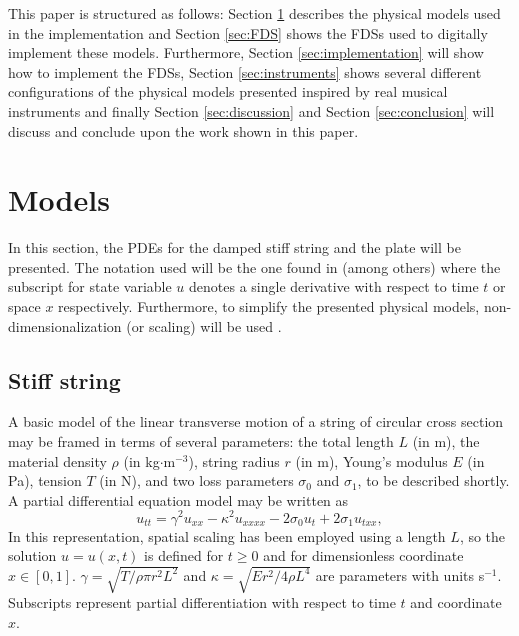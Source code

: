\documentclass{article}
\begin{document}
This paper is structured as follows: Section \ref{sec:PDE} describes the physical models used in the implementation and Section \ref{sec:FDS} shows the FDSs used to digitally implement these models. Furthermore, Section \ref{sec:implementation} will show how to implement the FDSs, Section \ref{sec:instruments} shows several different configurations of the physical models presented inspired by real musical instruments and finally Section \ref{sec:discussion} and Section \ref{sec:conclusion} will discuss and conclude upon the work shown in this paper.

\section{Models}\label{sec:PDE}
In this section, the PDEs for the damped stiff string and the plate will be presented. The notation used will be the one found in \cite{Bilbao2009:NumericalSoundSynthesis} (among others) where the subscript for state variable $u$ denotes a single derivative with respect to time $t$ or space $x$ respectively. Furthermore, to simplify the presented physical models, non-dimensionalization (or scaling) will be used \cite{Bilbao2009:NumericalSoundSynthesis}. 


\subsection{Stiff string}\label{subsec:stiffStringPDE}
A basic model of the linear transverse motion of a string of circular cross section may be framed in terms of several parameters: the total length $L$ (in m), the material density $\rho$ (in kg$\cdot$m$^{-3}$), string radius $r$ (in m), Young's modulus $E$ (in Pa), tension $T$ (in N), and two loss parameters $\sigma_{0}$ and $\sigma_{1}$, to be described shortly. A partial differential equation model may be written as
 \cite{Bilbao2009:NumericalSoundSynthesis} 
\begin{equation}\label{eq:stiffString}
    u_{tt} = \gamma^2 u_{xx}-\kappa^2u_{xxxx} - 2\sigma_0u_{t} + 2\sigma_1u_{txx},
\end{equation}
In this representation, spatial scaling has been employed using a length $L$, so the solution $u = u(x,t)$ is defined for $t\geq 0$ and for dimensionless coordinate $x\in[0,1]$. $\gamma = \sqrt{T/\rho\pi r^2 L^2}$ and $\kappa = \sqrt{Er^2/4\rho L^4}$ are parameters with units s$^{-1}$. Subscripts represent partial differentiation with respect to time $t$ and coordinate $x$. 
\end{document}
